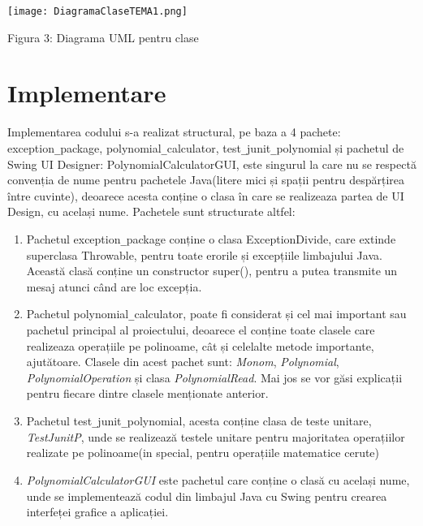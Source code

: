 \documentclass[a4paper,12pt]{article}
\begin{document}
\begin{enumerate}
\begin{center}
\texttt{[image: DiagramaClaseTEMA1.png]}
\end{center}
\begin{center}
    \caption{Figura 3: Diagrama UML pentru clase}
\end{center}
\vspace{1cm}
\section{Implementare}

Implementarea codului s-a realizat structural, pe baza a 4 pachete: exception\verb|_|package, polynomial\verb|_|calculator, test\verb|_|junit\verb|_|polynomial și pachetul de Swing UI Designer: PolynomialCalculatorGUI, este singurul la care nu se respectă convenția de nume pentru pachetele Java(litere mici și spații pentru despărțirea între cuvinte), deoarece acesta conține o clasa în care se realizeaza partea de UI Design, cu același nume.
\newline
Pachetele sunt structurate altfel:
\begin{enumerate}
\item Pachetul exception\verb|_|package conține o clasa ExceptionDivide, care extinde superclasa Throwable, pentru toate erorile și excepțiile limbajului Java.  Această clasă conține un constructor super(), pentru a putea transmite un mesaj atunci când are loc excepția.
\item Pachetul polynomial\verb|_|calculator, poate fi considerat și cel mai important sau pachetul principal al proiectului, deoarece el conține toate clasele care realizeaza operațiile pe polinoame, cât și celelalte metode importante, ajutătoare. Clasele din acest pachet sunt: \emph{Monom}, \emph{Polynomial}, \emph{PolynomialOperation} și clasa \emph{PolynomialRead}. Mai jos se vor găsi explicații pentru fiecare dintre clasele menționate anterior.
\item Pachetul test\verb|_|junit\verb|_|polynomial, acesta conține clasa de teste unitare, \emph{TestJunitP}, unde se realizează testele unitare pentru majoritatea operațiilor realizate pe polinoame(in special, pentru operațiile matematice cerute)
\item \emph{PolynomialCalculatorGUI} este pachetul care conține o clasă cu același nume, unde se implementează codul din limbajul Java cu Swing pentru crearea interfeței grafice a aplicației.
\newline
\newline

\end{enumerate}
\end{enumerate}
\end{document}
